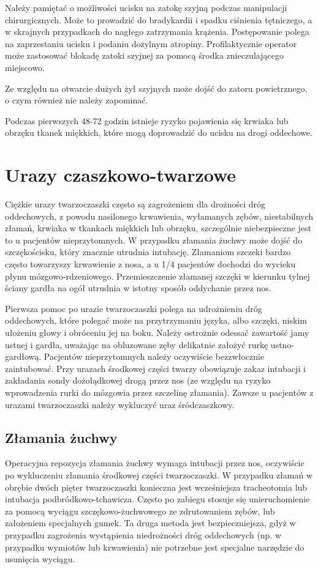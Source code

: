 \documentclass[a4paper, 12pt]{report}
\begin{document}
Należy pamiętać o możliwości ucisku na zatokę szyjną podczas
manipulacji chirurgicznych. Może to prowadzić do bradykardii i spadku
ciśnienia tętniczego, a w skrajnych przypadkach do nagłego zatrzymania
krążenia. Postępowanie polega na zaprzestaniu ucisku i podaniu
dożylnym atropiny. Profilaktycznie operator może zastosować blokadę
zatoki szyjnej za pomocą środka znieczulającego miejscowo.

Ze względu na otwarcie dużych żył szyjnych może dojść do zatoru
powietrznego, o czym również nie należy zapominać.

Podczas pierwszych 48-72 godzin istnieje ryzyko pojawienia się krwiaka
lub obrzęku tkanek miękkich, które mogą doprowadzić do ucisku na drogi
oddechowe.

\section{Urazy czaszkowo-twarzowe}

Ciężkie urazy twarzoczaszki często są zagrożeniem dla drożności dróg
oddechowych, z powodu nasilonego krwawienia, wyłamanych zębów,
niestabilnych złamań, krwiaka w tkankach miękkich lub obrzęku,
szczególnie niebezpieczne jest to u pacjentów nieprzytomnych. W
przypadku złamania żuchwy może dojść do szczękościsku, który znacznie
utrudnia intubację. Złamaniom szczeki bardzo często towarzyszy
krwawienie z nosa, a u 1/4 pacjentów dochodzi do wycieku płynu
mózgowo-rdzeniowego. Przemieszczenie złamanej szczęki w kierunku
tylnej ściany gardła na ogół utrudnia w istotny sposób oddychanie
przez nos.

Pierwsza pomoc po urazie twarzoczaszki polega na udrożnieniu dróg
oddechowych, które polegać może na przytrzymaniu języka, albo szczęki,
niskim ułożeniu głowy i obróceniu jej na boku. Należy ostrożnie
odessać zawartość jamy ustnej i gardła, uważając na obluzowane zęby
delikatnie założyć rurkę ustno-gardłową. Pacjentów nieprzytomnych
należy oczywiście bezzwłocznie zaintubować. Przy urazach środkowej
części twarzy obowiązuje zakaz intubacji i zakładania sondy
dożołądkowej drogą przez nos (ze względu na ryzyko wprowadzenia rurki
do mózgowia przez szczelinę złamania). Zawsze u pacjentów z urazami
twarzoczaszki należy wykluczyć uraz śródczaszkowy.

\subsection{Złamania żuchwy}

Operacyjna repozycja złamania żuchwy wymaga intubacji przez nos,
oczywiście po wykluczeniu złamania środkowej części twarzoczaszki. W
przypadku złamań w obrębie dwóch pięter twarzoczaszki konieczna jest
wcześniejsza tracheotomia lub intubacja podbródkowo-tchawicza. Często
po zabiegu stosuje się unieruchomienie za pomocą wyciągu
szczękowo-żuchwowego ze zdrutowaniem zębów, lub założeniem
specjalnych gumek. Ta druga metoda jest bezpieczniejsza, gdyż w
przypadku zagrożenia wystąpienia niedrożności dróg oddechowych (np. w
przypadku wymiotów lub krwawienia) nie potrzebne jest specjalne
narzędzie do usunięcia wyciągu.
\end{document}
